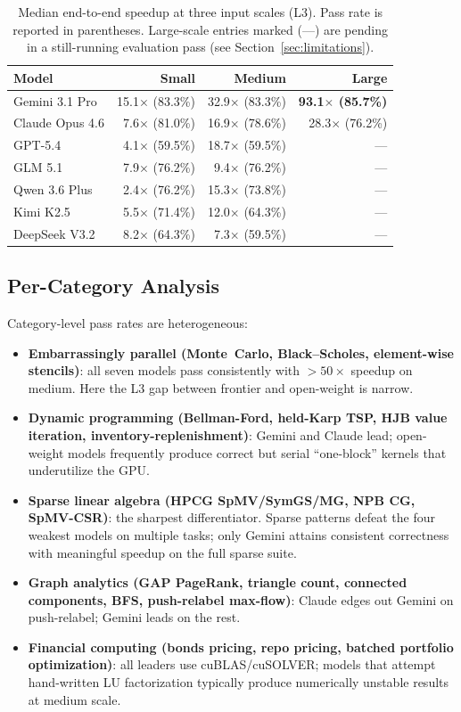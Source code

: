 \documentclass{article}
\begin{document}
\begin{table}[ht]
\centering
\small
\caption{Median end-to-end speedup at three input scales (L3). Pass rate is reported in parentheses. Large-scale entries marked (---) are pending in a still-running evaluation pass (see Section~\ref{sec:limitations}).}
\label{tab:scales-results}
\begin{tabular}{@{}lrrr@{}}
\toprule
\textbf{Model} & \textbf{Small} & \textbf{Medium} & \textbf{Large} \\
\midrule
Gemini 3.1 Pro    & 15.1$\times$ (83.3\%) & 32.9$\times$ (83.3\%) & \textbf{93.1$\times$ (85.7\%)} \\
Claude Opus 4.6   &  7.6$\times$ (81.0\%) & 16.9$\times$ (78.6\%) & 28.3$\times$ (76.2\%) \\
GPT-5.4           &  4.1$\times$ (59.5\%) & 18.7$\times$ (59.5\%) & --- \\
GLM 5.1           &  7.9$\times$ (76.2\%) &  9.4$\times$ (76.2\%) & --- \\
Qwen 3.6 Plus     &  2.4$\times$ (76.2\%) & 15.3$\times$ (73.8\%) & --- \\
Kimi K2.5         &  5.5$\times$ (71.4\%) & 12.0$\times$ (64.3\%) & --- \\
DeepSeek V3.2     &  8.2$\times$ (64.3\%) &  7.3$\times$ (59.5\%) & --- \\
\bottomrule
\end{tabular}
\end{table}

\subsection{Per-Category Analysis}

Category-level pass rates are heterogeneous:
\begin{itemize}
  \item \textbf{Embarrassingly parallel (Monte~Carlo, Black--Scholes, element-wise stencils)}: all seven models pass consistently with $>50\times$ speedup on medium. Here the L3 gap between frontier and open-weight is narrow.
  \item \textbf{Dynamic programming (Bellman-Ford, held-Karp TSP, HJB value iteration, inventory-replenishment)}: Gemini and Claude lead; open-weight models frequently produce correct but serial ``one-block'' kernels that underutilize the GPU.
  \item \textbf{Sparse linear algebra (HPCG SpMV/SymGS/MG, NPB CG, SpMV-CSR)}: the sharpest differentiator. Sparse patterns defeat the four weakest models on multiple tasks; only Gemini attains consistent correctness with meaningful speedup on the full sparse suite.
  \item \textbf{Graph analytics (GAP PageRank, triangle count, connected components, BFS, push-relabel max-flow)}: Claude edges out Gemini on push-relabel; Gemini leads on the rest.
  \item \textbf{Financial computing (bonds pricing, repo pricing, batched portfolio optimization)}: all leaders use cuBLAS/cuSOLVER; models that attempt hand-written LU factorization typically produce numerically unstable results at medium scale.
\end{itemize}
\end{document}
